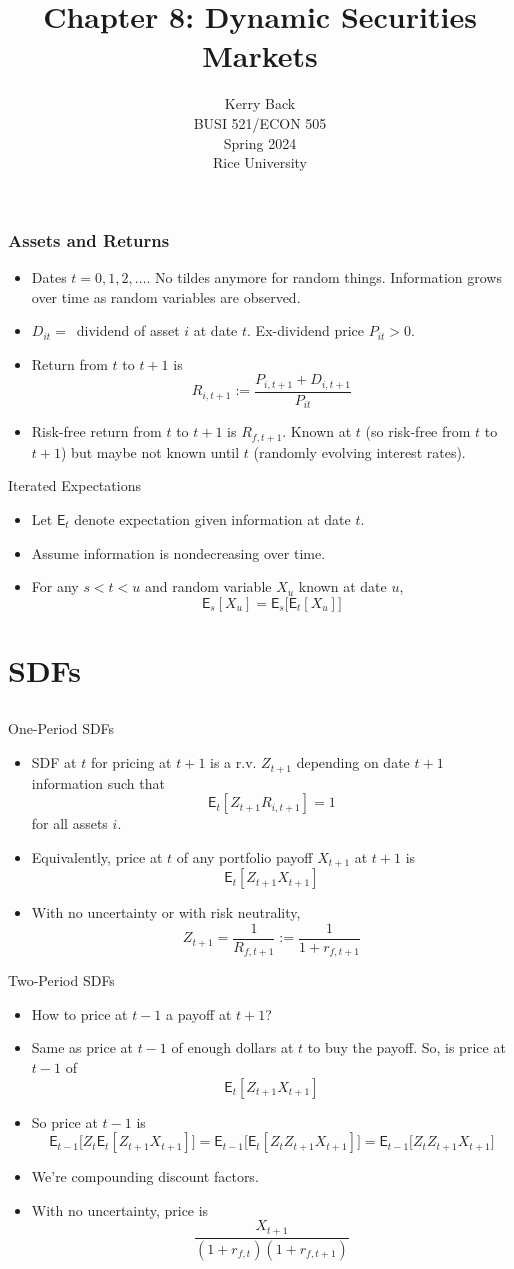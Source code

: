 \documentclass[10pt]{beamer}
\title{Chapter 8: Dynamic Securities Markets}
\date{}
\author{Kerry Back\\ 
BUSI 521/ECON 505\\
Spring 2024\\
Rice University}
\newcommand{\bi}{\begin{itemize}}
\newcommand{\ei}{\end{itemize}}
\newcommand{\im}{\item}
\newcommand{\mye}{\ensuremath{\mathsf{E}}}
\newcommand{\bfr}{\begin{frame}}
\begin{document}
\maketitle


\bfr\frametitle{Assets and Returns}
\bi \im Dates $t=0,1,2,\ldots$.  No tildes anymore for random things.  Information grows over time as random variables are observed.
 \im 
$D_{it}=\,$ dividend of asset $i$ at date $t$.
 Ex-dividend price $P_{it}>0$.  
 \im 
Return from $t$ to $t+1$ is
$$R_{i,t+1} := \frac{P_{i,t+1}+D_{i,t+1}}{P_{it}}$$

\im Risk-free return from $t$ to $t+1$ is $R_{f,t+1}$.  Known at $t$ (so risk-free from $t$ to $t+1$) but maybe not known until $t$ (randomly evolving interest rates).
\ei
\end{frame}

\begin{frame}{Iterated Expectations}
    \bi 
    \im Let $\mye_t$ denote expectation given information at date $t$.
    \im Assume information is nondecreasing over time.
    \im For any $s<t<u$ and random variable $X_u$ known at date $u$,
    $$\mye_s[X_u] = \mye_s\bigg[ \mye_t[X_u]\bigg]$$
    \ei
 \end{frame}

\section{SDFs}\subsection{}

\begin{frame}{One-Period SDFs}

\bi 
\im SDF at $t$ for pricing at $t+1$ is a r.v. $Z_{t+1}$ depending on date $t+1$ information such that
$$\mye_t[Z_{t+1}R_{i, t+1}] = 1$$
for all assets $i$.
\im Equivalently, price at $t$ of any portfolio payoff $X_{t+1}$ at $t+1$ is
$$\mye_t[Z_{t+1}X_{t+1}]$$
\im With no uncertainty or with risk neutrality,
$$Z_{t+1} = \frac{1}{R_{f, t+1}} := \frac{1}{1+r_{f, t+1}}$$
\ei
\end{frame}

\begin{frame}{Two-Period SDFs}
\bi 
\im How to price at $t-1$ a payoff at $t+1$?
\pause 
\im Same as price at $t-1$ of enough dollars at $t$ to buy the payoff.  So, is price at $t-1$ of 
$$\mye_t[Z_{t+1}X_{t+1}]$$
\pause 
\im So price at $t-1$ is
$$\mye_{t-1}\bigg[Z_t\mye_t[Z_{t+1}X_{t+1}]\bigg] = \mye_{t-1}\bigg[\mye_t[Z_tZ_{t+1}X_{t+1}]\bigg] = \mye_{t-1}\bigg[Z_tZ_{t+1}X_{t+1}\bigg]$$
\im We're compounding discount factors. 
\im With no uncertainty, price is 
$$\frac{X_{t+1}}{(1+r_{f,t})(1+r_{f,t+1})}$$
\ei
\end{frame}
\end{document}
